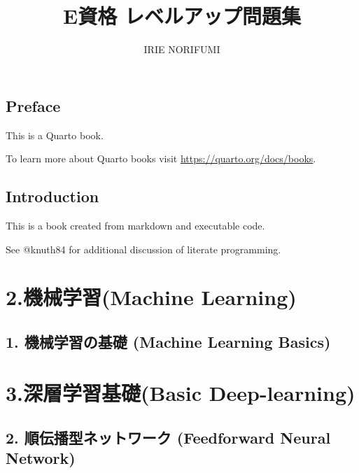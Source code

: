 \documentclass[
  letterpaper,
  DIV=11,
  numbers=noendperiod]{scrreprt}
\title{E資格 レベルアップ問題集}
\author{IRIE NORIFUMI}
\date{}
\renewcommand*\contentsname{Table of contents}
\newcommand\contentsname{Table of contents}
\begin{document}
\maketitle

\renewcommand*\contentsname{Table of contents}
{
\hypersetup{linkcolor=}
\setcounter{tocdepth}{2}
\tableofcontents
}


\chapter*{Preface}\label{preface}


This is a Quarto book.

To learn more about Quarto books visit
\url{https://quarto.org/docs/books}.


\chapter{Introduction}\label{introduction}

This is a book created from markdown and executable code.

See @knuth84 for additional discussion of literate programming.

\part{2.機械学習(Machine Learning)}

\chapter{1. 機械学習の基礎 (Machine Learning
Basics)}\label{ux6a5fux68b0ux5b66ux7fd2ux306eux57faux790e-machine-learning-basics}

\part{3.深層学習基礎(Basic Deep-learning)}

\chapter{2. 順伝播型ネットワーク (Feedforward Neural
Network)}\label{ux9806ux4f1dux64adux578bux30cdux30c3ux30c8ux30efux30fcux30af-feedforward-neural-network}
\end{document}
